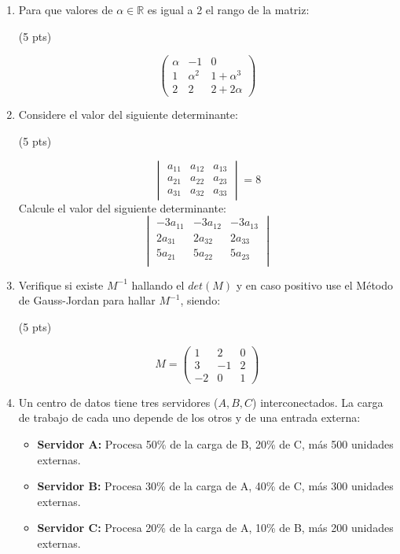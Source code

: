 \documentclass[12pt,letterpaper,landscape]{article}
\begin{document}
	\begin{enumerate}
		\item Para que valores de $\alpha \in \mathbb{R}$ es igual a 2 el rango de la matriz:
		\begin{flushright}{(5 pts)}\end{flushright}
		\[
		\begin{pmatrix} \alpha & -1 & 0 \\ 
			1 & \alpha^2 & 1+\alpha^3	\\
			2 & 2 & 2+2\alpha 
		\end{pmatrix}
		\]
		\item Considere el valor  del siguiente determinante:
		\begin{flushright}{(5 pts)}\end{flushright}
		\[
		\begin{vmatrix}
			a_{11} & a_{12} & a_{13} \\
			a_{21} & a_{22} & a_{23} \\
			a_{31} & a_{32} & a_{33} \end{vmatrix}=8
		\]
		Calcule el valor del siguiente determinante:
		\[
		\begin{vmatrix}
			-3a_{11} & -3a_{12} & -3a_{13} \\
			2a_{31} & 2a_{32} & 2a_{33} \\
			5a_{21} & 5a_{22} & 5a_{23} \\
			 \end{vmatrix}
		\]
	\item Verifique si existe $M^{-1}$ hallando el $det(M)$ y en caso positivo use el Método de Gauss-Jordan para hallar $M^{-1}$, siendo:
	\begin{flushright}{(5 pts)}\end{flushright}
	\[
	M = \begin{pmatrix} 1 & 2 & 0 \\ 3 & -1 & 2 \\ -2 & 0 & 1 \end{pmatrix}
	\]

	\item Un centro de datos tiene tres servidores ($A, B, C$) interconectados. La carga de trabajo de cada uno depende de los otros y de una entrada externa:
        \begin{itemize}
            \item \textbf{Servidor A:} Procesa 50\% de la carga de B, 20\% de C, más 500 unidades externas.            
            \item \textbf{Servidor B:} Procesa 30\% de la carga de A, 40\% de C, más 300 unidades externas.
            \item \textbf{Servidor C:} Procesa 20\% de la carga de A, 10\% de B, más 200 unidades externas.
        \end{itemize}


\end{enumerate}
\end{document}
